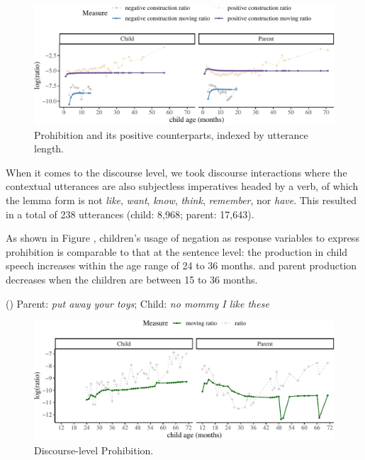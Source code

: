 \documentclass[
  english,
  man,floatsintext]{apa6}
\begin{document}
\begin{figure}[H]

{\centering \includegraphics{neg_construction_article_files/figure-latex/prohibitionul-1} 

}

\caption{Prohibition and its positive counterparts, indexed by utterance length.}\label{fig:prohibitionul}
\end{figure}

When it comes to the discourse level, we took discourse interactions where the contextual utterances are also subjectless imperatives headed by a verb, of which the lemma form is not \emph{like}, \emph{want}, \emph{know}, \emph{think}, \emph{remember}, nor \emph{have}. This resulted in a total of 238 utterances (child: 8,968; parent: 17,643).

As shown in Figure , children's usage of negation as response variables to express prohibition is comparable to that at the sentence level: the production in child speech increases within the age range of 24 to 36 months. and parent production decreases when the children are between 15 to 36 months.

() Parent: \emph{put away your toys}; Child: \emph{no mommy I like these}

\begin{figure}[H]

{\centering \includegraphics{neg_construction_article_files/figure-latex/prohibitiondiscourse-1} 

}

\caption{Discourse-level Prohibition.}\label{fig:prohibitiondiscourse}
\end{figure}
\end{document}
